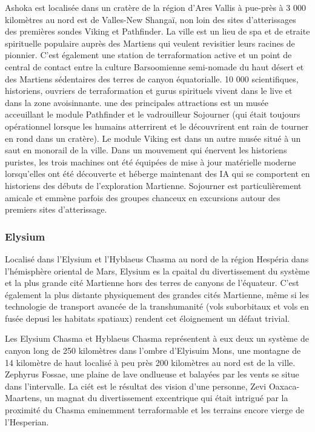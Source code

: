                                                             Ashoka est localisée dans un cratère de la région d'Ares Vallis à pue-près à 3 000 kilomètres au nord est de Valles-New Shangaï, non loin des sites d'atterissages des premières sondes Viking et Pathfinder. La ville est un lieu de spa et de etraite spirituelle populaire auprès des Martiens qui veulent revisitier leurs racines de pionnier. C'est également une station de terraformation active et un point de central de contact entre la culture Barsoomienne semi-nomade du haut désert et des Martiens sédentaires des terres de canyon équatorialle. 10 000 scientifiques, historiens, ouvriers de terraformation et gurus spirituels vivent dans le live et dans la zone avoisinnante. une des principales attractions est un musée acceuillant le module Pathfinder et le vadrouilleur Sojourner (qui était toujours opérationnel lorsque les humains atterrirent et le découvrirent ent rain de tourner en rond dans un cratère). Le module Viking est dans un autre musée situé à un saut en monorail de la ville. Dans un mouvement qui énervent les historiens puristes, les trois machines ont été équipées de mise à jour matérielle moderne lorsqu'elles ont été découverte et héberge maintenant des IA qui se comportent en historiens des débuts de l'exploration Martienne. Sojourner est particulièrement amicale et emmène parfois des groupes chanceux en excursions autour des premiers sites d'atterissage. 

                                                            \subsubsection{Elysium} \label{sec:elysium} 

                                                            Localisé dans l'Elysium et l'Hyblaeus Chasma au nord de la région Hespéria dans l'hémisphère oriental de Mars, Elysium es la cpaital du divertissement du système et la plus grande cité Martienne hors des terres de canyons de l'équateur. C'est également la plus distante physiquement des grandes cités Martienne, même si les technologie de transport avancée de la transhumanité (vols suborbitaux et vols en fusée depusi les habitats spatiaux) rendent cet éloignement un défaut trivial. 

                                                            Les Elysium Chasma et Hyblaeus Chasma représentent à eux deux un système de canyon long de 250 kilomètres dans l'ombre d'Elyisuim Mons, une montagne de 14 kilomètre de haut localisé à peu près 200 kilomètres au nord est de la ville. Zephyrus Fossae, une plaine de lave ondlueuse et balayées par les vents se situe dans l'intervalle. La ciét est le résultat des vision d'une personne, Zevi Oaxaca-Maartens, un magnat du divertissement excentrique qui était intrigué par la proximité du Chasma eminemment terraformable et les terrains encore vierge de l'Hesperian. 

